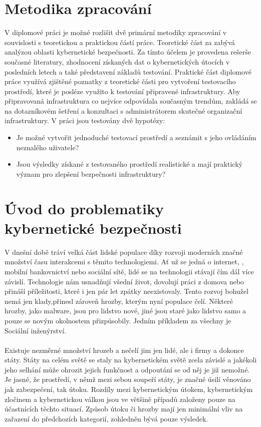 \section{Metodika zpracování}\label{sec:metodika-zpracovani}%
V diplomové práci je možné rozlišit dvě primární metodiky zpracování v souvislosti s teoretickou a praktickou částí práce.
Teoretické část za zabývá analýzou oblasti kybernetické bezpečnosti.
Za tímto účelem je provedena rešerše současné literatury, zhodnocení získaných dat o kybernetických útocích v posledních letech a také představení základů testování.
Praktické část diplomové práce využívá zjištěné poznatky z teoretické části pro vytvoření testovacího prostředí, které je posléze využito k testování připravené infrastruktury.
Aby připravovaná infrastruktura co nejvíce odpovídala současným trendům, zakládá se na dotazníkovém šetření a konzultaci s administrátorem skutečné organizační infrastruktury.
V práci jsou testovány dvě hypotézy:

\begin{itemize}
	\item Je možné vytvořit jednoduché testovací prostředí a seznámit s jeho ovládáním neznalého uživatele?
	\item Jsou výsledky získané z testovaného prostředí realistické a mají praktický význam pro zlepšení bezpečnosti infrastruktury?
\end{itemize}



\section{Úvod do problematiky kybernetické bezpečnosti}\label{sec:uvod-do-problematiky-kyberneticke-bezpecnosti}
V dnešní době tráví velká část lidské populace díky rozvoji moderních značné množství času interakcemi s těmito technologiemi.
Ať už se jedná o internet, , mobilní bankovnictví nebo sociální sítě, lidé se na technologii stávají čím dál více závislí.
Technologie nám usnadňují všední život, dovolují práci z domova nebo přináší příležitosti, které i jen pár let zpátky neexistovaly.
Tento rozvoj bohužel nemá jen klady,přinesl zároveň hrozby, kterým nyní populace čelí.
Některé hrozby, jako malware, jsou pro lidstvo nové, jiné jsou staré jako lidstvo samo a pouze se novým okolnostem přizpůsobily.
Jedním příkladem za všechny je Sociální inženýrství.

\paragraph{}
Existuje nezměrné množství hrozeb a nečelí jim jen lidé, ale i firmy a dokonce státy.
Státy na celém světě se staly na kybernetickém světě zcela závislé a jakékoli jeho selhání může ohrozit jejich funkčnost a odpoutání se od něj je již nemožné.\cite{LI20218176}
Je jasné, že prostředí, v němž mezi sebou soupeří státy, je značné úsilí věnováno jak zabezpečení, tak útoku.
Rozdíly mezi kybernetickým útokem, kybernetickým zločinem a kybernetickou válkou jsou ve většině případů založeny pouze na účastnících těchto situací.\cite{LI20218176}
Způsob útoku či hrozby mají jen minimální vliv na zařazení do předchozích kategorií, zohledněn bývá pouze výsledek.

